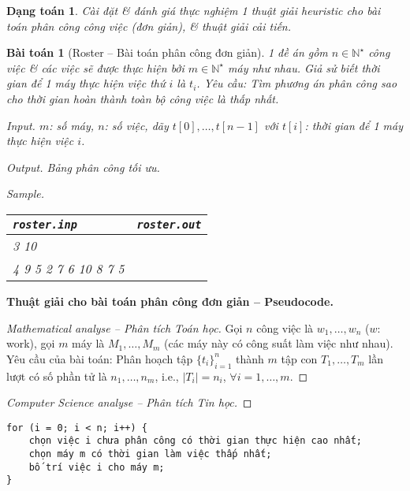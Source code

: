 \documentclass{article}
\newtheorem{baitoan}{Bài toán}
\newtheorem{dangtoan}{Dạng toán}
\begin{document}
\begin{dangtoan}
	Cài đặt \& đánh giá thực nghiệm 1 thuật giải heuristic cho bài toán phân công công việc (đơn giản), \& thuật giải cải tiến.
\end{dangtoan}

\begin{baitoan}[Roster -- Bài toán phân công đơn giản]
	1 đề án gồm $n\in\mathbb{N}^\star$ công việc \& các việc sẽ được thực hiện bởi $m\in\mathbb{N}^\star$ máy như nhau. Giả sử biết thời gian để 1 máy thực hiện việc thứ $i$  là $t_i$. Yêu cầu: Tìm phương án phân công sao cho thời gian hoàn thành toàn bộ công việc là thấp nhất.
	\item {\sf Input.} $m$: số máy, $n$: số việc, dãy $t[0],\ldots,t[n-1]$ với $t[i]$: thời gian để 1 máy thực hiện việc $i$.
	\item {\sf Output.} Bảng phân công tối ưu.
	\item {\sf Sample.}
	\begin{table}[H]
		\centering
		\begin{tabular}{|l|l|}
			\hline
			{\tt roster.inp} & {\tt roster.out} \\
			\hline
			3 10 &  \\
			4 9 5 2 7 6 10 8 7 5 &  \\
			\hline
		\end{tabular}
	\end{table}
\end{baitoan}
\noindent\textbf{\textsf{Thuật giải cho bài toán phân công đơn giản -- Pseudocode.}}
\begin{proof}[Mathematical analyse -- Phân tích Toán học]
	Gọi $n$ công việc là $w_1,\ldots,w_n$ ($w$: work), gọi $m$ máy là $M_1,\ldots,M_m$ (các máy này có công suất làm việc như nhau). Yêu cầu của bài toán: Phân hoạch tập $\{t_i\}_{i=1}^n$ thành $m$ tập con $T_1,\ldots,T_m$ lần lượt có số phần tử là $n_1,\ldots,n_m$, i.e., $|T_i| = n_i$, $\forall i = 1,\ldots,m$.
\end{proof}

\begin{proof}[Computer Science analyse -- Phân tích Tin học]
	
\end{proof}

\begin{verbatim}
for (i = 0; i < n; i++) {
    chọn việc i chưa phân công có thời gian thực hiện cao nhất;
    chọn máy m có thời gian làm việc thấp nhất;
    bố trí việc i cho máy m;
}
\end{verbatim}
\end{document}

